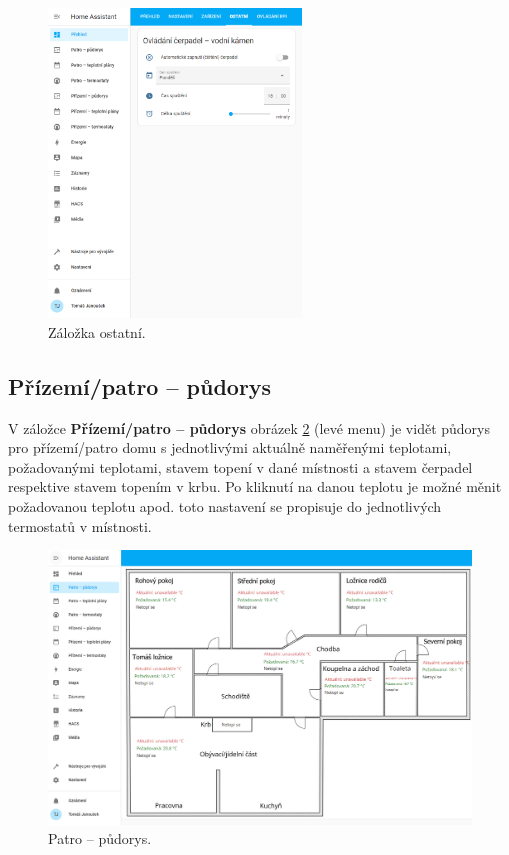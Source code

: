 \begin{Czech}
\begin{figure}[H]
    \centering
    \includegraphics[width=0.6\textwidth]{pictures/czech/software/tab-others.png}
    \caption{Záložka ostatní.}
    \label{fig:tab-others}
\end{figure}
\end{Czech}


\newpage
\begin{Czech}
\subsection{Přízemí/patro – půdorys}
\end{Czech}

\begin{Czech}
V záložce \textbf{Přízemí/patro – půdorys} obrázek \ref{fig:floor-plan-first-floor} (levé menu) je vidět půdorys pro přízemí/patro domu s jednotlivými aktuálně naměřenými teplotami, požadovanými teplotami, stavem topení v dané místnosti a stavem čerpadel respektive stavem topením v krbu. Po kliknutí na danou teplotu je možné měnit požadovanou teplotu apod. toto nastavení se propisuje do jednotlivých termostatů v místnosti.
\end{Czech}

\begin{Czech}
\begin{figure}[H]
    \centering
    \includegraphics[width=1\textwidth]{pictures/czech/software/floor-plan-first-floor.png}
    \caption{Patro – půdorys.}
    \label{fig:floor-plan-first-floor}
\end{figure}
\end{Czech}
